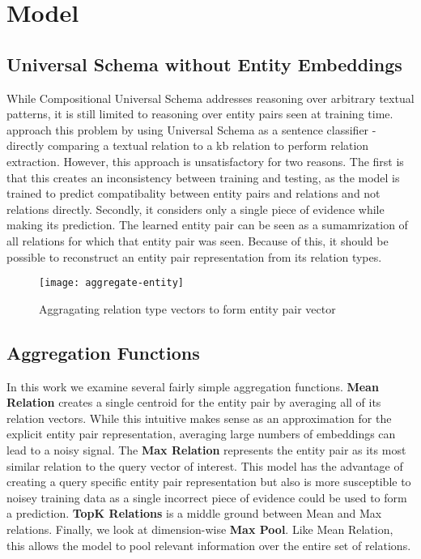 \section{Model \label{sec:model}}

\subsection {Universal Schema without Entity Embeddings}

While Compositional Universal Schema addresses reasoning over arbitrary textual patterns, it is still limited to reasoning over entity pairs seen at training time.
\citet{verga2015multilingual} approach this problem by using Universal Schema as a sentence classifier - directly comparing a textual relation to a kb relation to perform relation extraction.
However, this approach is unsatisfactory for two reasons.
The first is that this creates an inconsistency between training and testing, as the model is trained to predict compatibality between entity pairs and relations and not relations directly.
Secondly, it considers only a single piece of evidence while making its prediction.
The learned entity pair can be seen as a sumamrization of all relations for which that entity pair was seen.
Because of this, it should be possible to reconstruct an entity pair representation from its relation types.



\begin{figure}[h]
\caption{Aggragating relation type vectors to form entity pair vector}
\centering
\texttt{[image: aggregate-entity]}
\end{figure}


\subsection {Aggregation Functions \label{sec:functions}}
In this work we examine several fairly simple aggregation functions.
\textbf{Mean Relation} creates a single centroid for the entity pair by averaging all of its relation vectors.
While this intuitive makes sense as an approximation for the explicit entity pair representation, averaging large numbers of embeddings can lead to a noisy signal.
The \textbf{Max Relation} represents the entity pair as its most similar relation to the query vector of interest.
This model has the advantage of creating a query specific entity pair representation but also is more susceptible to noisey training data as a single incorrect piece of evidence could be used to form a prediction.
\textbf {TopK Relations} is a middle ground between Mean and Max relations.
Finally, we look at dimension-wise \textbf{Max Pool}.
Like Mean Relation, this allows the model to pool relevant information over the entire set of relations.

